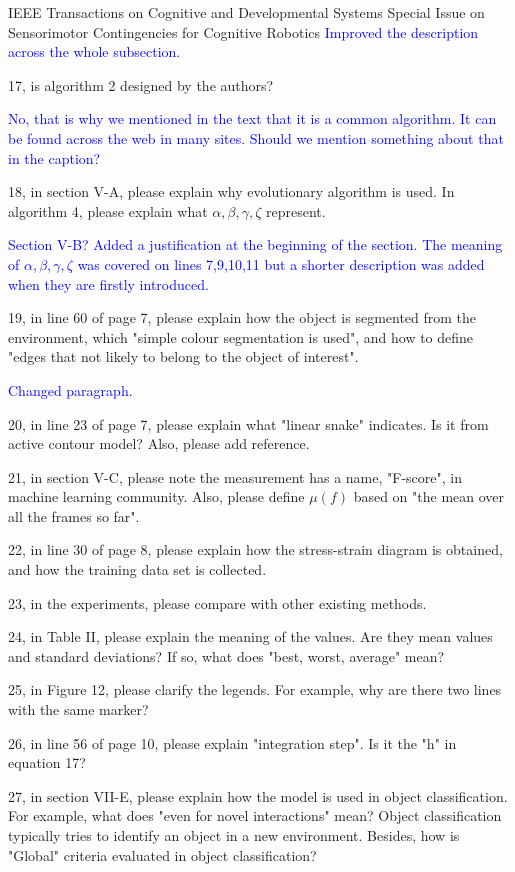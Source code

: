 \documentclass[a4paper,12pt]{letter}
\newcommand{\comment}[1]{\textcolor{blue}{#1}}
\begin{document}
\begin{letter}{IEEE Transactions on Cognitive and Developmental Systems\newline
Special Issue on Sensorimotor Contingencies for Cognitive Robotics}
\comment{Improved the description across the whole subsection.}

17, is algorithm 2 designed by the authors?

\comment{No, that is why we mentioned in the text that it is a common algorithm.  It can be found across the web in many sites.  Should we mention something about that in the caption?}

18, in section V-A, please explain why evolutionary algorithm is used. In algorithm 4, please explain what $\alpha, \beta, \gamma, \zeta$ represent.

\comment{Section V-B? Added a justification at the beginning of the section.  The meaning of $\alpha, \beta, \gamma, \zeta$ was covered on lines 7,9,10,11 but a shorter description was added when they are firstly introduced.}

19, in line 60 of page 7, please explain how the object is segmented from the environment, which "simple colour segmentation is used", and how to define "edges that not likely to belong to the object of interest".

\comment{Changed paragraph.}

20, in line 23 of page 7, please explain what "linear snake" indicates. Is it from active contour model? Also, please add reference. 

21, in section V-C, please note the measurement has a name, "F-score", in machine learning community. Also, please define $\mu(f)$ based on "the mean over all the frames so far". 

22, in line 30 of page 8, please explain how the stress-strain diagram is obtained, and how the training data set is collected. 

23, in the experiments, please compare with other existing methods. 

24, in Table II, please explain the meaning of the values. Are they mean values and standard deviations? If so, what does "best, worst, average" mean? 

25, in Figure 12, please clarify the legends. For example, why are there two lines with the same marker? 

26, in line 56 of page 10, please explain "integration step". Is it the "h" in equation 17? 

27, in section VII-E, please explain how the model is used in object classification. For example, what does "even for novel interactions" mean? Object classification typically tries to identify an object in a new environment. Besides, how is "Global" criteria evaluated in object classification? 


\end{letter}
\end{document}
